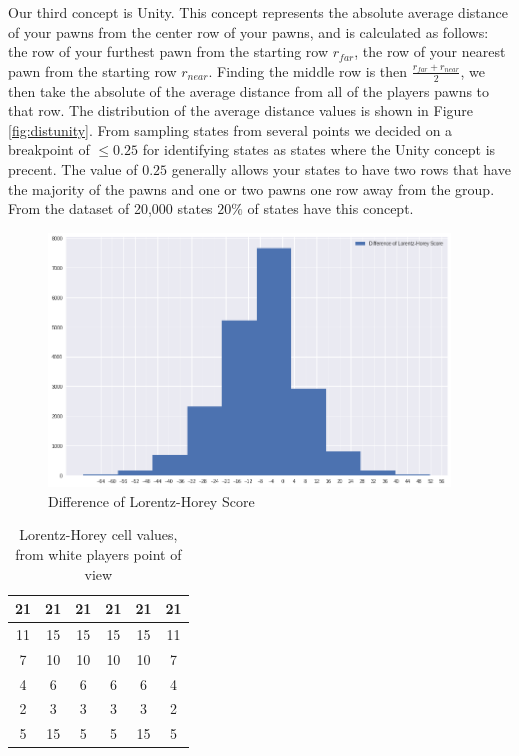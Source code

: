 Our third concept is Unity. This concept represents the absolute average distance of your pawns from the center row of your pawns, and is calculated as follows: the row of your furthest pawn from the starting row $r_{far}$, the row of your nearest pawn from the starting row $r_{near}$. Finding the middle row is then $\frac{r_{far} + r_{near}}{2}$, we then take the absolute of the average distance from all of the players pawns to that row. The distribution of the average distance values is shown in Figure \ref{fig:distunity}. From sampling states from several points we decided on a breakpoint of $\le 0.25$ for identifying states as states where the Unity concept is precent. The value of $0.25$ generally allows your states to have two rows that have the majority of the pawns and one or two pawns one row away from the group. From the dataset of 20,000 states $20\%$ of states have this concept.

\begin{figure}
    \begin{small}
        \begin{center}
            \includegraphics[width=0.95\textwidth]{graphics/dist_lorentz}
        \end{center}
        \caption{Difference of Lorentz-Horey Score}
        \label{fig:distlorentz}
    \end{small}
\end{figure}

\begin{table}[]
    \centering
    \caption{Lorentz-Horey cell values, from white players point of view}
    \begin{tabular}{|c|c|c|c|c|c|}
        \hline
        21 & 21 & 21 & 21 & 21 & 21 \\\hline
        11 & 15 & 15 & 15 & 15 & 11 \\\hline
        7  & 10 & 10 & 10 & 10 & 7  \\\hline
        4  & 6  & 6  & 6  & 6  & 4  \\\hline
        2  & 3  & 3  & 3  & 3  & 2  \\\hline
        5  & 15 & 5  & 5  & 15 & 5  \\\hline
    \end{tabular}
    \label{table:lorentzcell}
\end{table}

